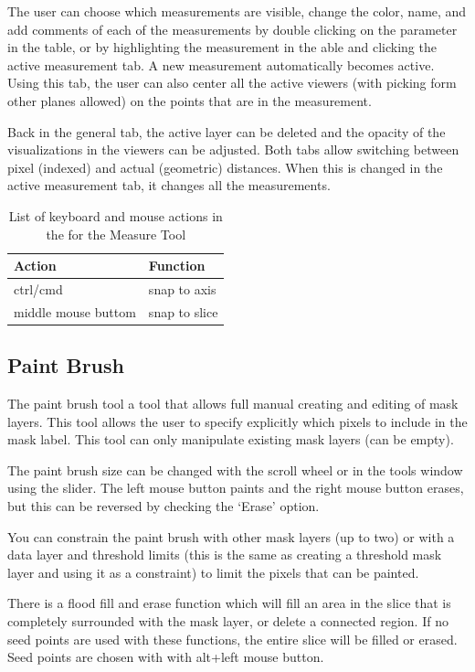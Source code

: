 \documentclass[fleqn,11pt,openany]{book}
\begin{document}
The user can choose which measurements are visible, change the color, name, and add comments of each of the measurements by double clicking on the parameter in the table, or by highlighting the measurement in the able and clicking the active measurement tab.  A new measurement automatically becomes active.  Using this tab, the user can also center all the active viewers (with picking form other planes allowed) on the points that are in the measurement.  

Back in the general tab, the active layer can be deleted and the opacity of the visualizations in the viewers can be adjusted.  Both tabs allow switching between pixel (indexed) and actual (geometric) distances.  When this is changed in the active measurement tab, it changes all the measurements.  

\begin{table}[h!]
\label{tab:measurekey}
\caption{List of keyboard and mouse actions in the for the Measure Tool}
\begin{tabular}{|l|l|}
\hline
{\bf Action} & {\bf Function}\\
\hline
ctrl/cmd & snap to axis\\
\hline
middle mouse buttom & snap to slice\\
\hline
\end{tabular}
\end{table}


\subsection{Paint Brush}

The paint brush tool a tool that allows full manual creating and editing of mask layers.  This tool allows the user to specify explicitly which pixels to include in the mask label.  This tool can only manipulate existing mask layers (can be empty).   

The paint brush size can be changed with the scroll wheel or in the tools window using the slider.   The left mouse button paints and the right mouse button erases, but this can be reversed by checking the `Erase' option.  

You can constrain the paint brush with other mask layers (up to two) or with a data layer and threshold limits (this is the same as creating a threshold mask layer and using it as a constraint) to limit the pixels that can be painted. 

There is a flood fill and erase function which will fill an area in the slice that is completely surrounded with the mask layer, or delete a connected region.  If no seed points are used with these functions, the entire slice will be filled or erased.  Seed points are chosen with with alt+left mouse button.  
\end{document}
